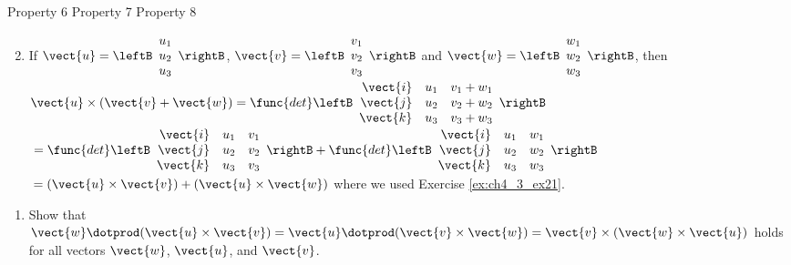 \begin{multicols}{2}
\begin{ex}
\begin{exenumerate}
\exitem Property 6
\exitem Property 7
\exitem Property 8
\end{exenumerate}

\begin{sol}
\begin{enumerate}[label={\alph*.}]
\setcounter{enumi}{1} 
\item If
$\vect{u} = \leftB
\begin{array}{r}
u_{1}\\
u_{2}\\
u_{3}
\end{array}
\rightB$,
$\vect{v} = \leftB
\begin{array}{r}
v_{1}\\
v_{2}\\
v_{3}
\end{array}
\rightB$ and
$\vect{w} = \leftB
\begin{array}{r}
w_{1}\\
w_{2}\\
w_{3}
\end{array}
\rightB$, then
$\vect{u} \times (\vect{v} + \vect{w}) = \func{det}\leftB
\begin{array}{rrr}
\vect{i} & u_{1} & v_{1} + w_{1}\\
\vect{j} & u_{2} & v_{2} + w_{2}\\
\vect{k} & u_{3} & v_{3} + w_{3}
\end{array}
\rightB$ \\
${} = 
\func{det}\leftB
\begin{array}{rrr}
\vect{i} & u_{1} & v_{1}\\
\vect{j} & u_{2} & v_{2}\\
\vect{k} & u_{3} & v_{3}
\end{array}
\rightB
+
\func{det}\leftB
\begin{array}{rrr}
\vect{i} & u_{1} & w_{1}\\
\vect{j} & u_{2} & w_{2}\\
\vect{k} & u_{3} & w_{3}
\end{array}
\rightB$ \\ ${} = (\vect{u} \times \vect{v}) + (\vect{u} \times \vect{w})$
where we used Exercise \ref{ex:ch4_3_ex21}. 
\end{enumerate}
\end{sol}
\end{ex}

\begin{ex} \label{ex:ch4_3_ex16}
\begin{enumerate}[label={\alph*.}]
\item Show that $\vect{w} \dotprod (\vect{u} \times \vect{v}) = \vect{u} \dotprod (\vect{v} \times \vect{w}) = \vect{v} \times (\vect{w} \times \vect{u})$ holds for all vectors $\vect{w}$, $\vect{u}$, and $\vect{v}$.


\end{enumerate}
\end{ex}
\end{multicols}
